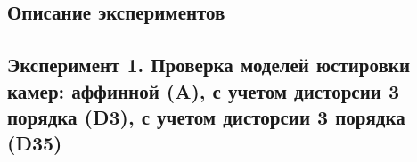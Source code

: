\begin{center}\section{Описание экспериментов}\end{center}
\subsection{Эксперимент 1. Проверка моделей юстировки камер: аффинной (A), с учетом дисторсии 3 порядка (D3), с учетом дисторсии 3 порядка (D35)}




